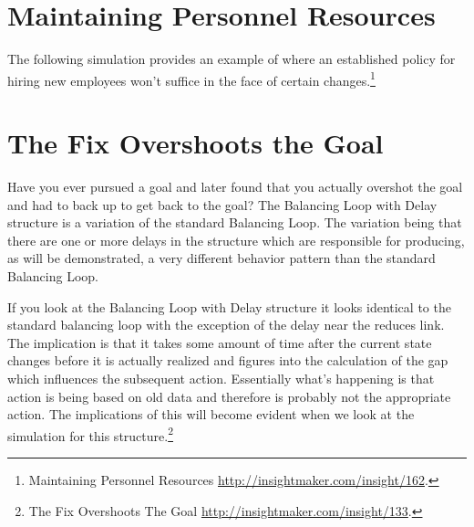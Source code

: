 \documentclass[]{memoir}
\begin{document}
\FloatBarrier 

\begin{model}[frametitle={Model: Climate Stabilization Task}] 

 


 \end{model}

\section{Maintaining Personnel Resources}

The following simulation provides an example of where an established
policy for hiring new employees won't suffice in the face of certain
changes.\footnote{Maintaining Personnel Resources
  \url{http://insightmaker.com/insight/162}.}

\FloatBarrier 

\begin{model}[frametitle={Model: Maintaining Personnel Resources}] 

 


 \end{model}

\section{The Fix Overshoots the Goal}

Have you ever pursued a goal and later found that you actually overshot
the goal and had to back up to get back to the goal? The Balancing Loop
with Delay structure is a variation of the standard Balancing Loop. The
variation being that there are one or more delays in the structure which
are responsible for producing, as will be demonstrated, a very different
behavior pattern than the standard Balancing Loop.

If you look at the Balancing Loop with Delay structure it looks
identical to the standard balancing loop with the exception of the delay
near the reduces link. The implication is that it takes some amount of
time after the current state changes before it is actually realized and
figures into the calculation of the gap which influences the subsequent
action. Essentially what's happening is that action is being based on
old data and therefore is probably not the appropriate action. The
implications of this will become evident when we look at the simulation
for this structure.\footnote{The Fix Overshoots The Goal
  \url{http://insightmaker.com/insight/133}.}

\FloatBarrier 
\end{document}
